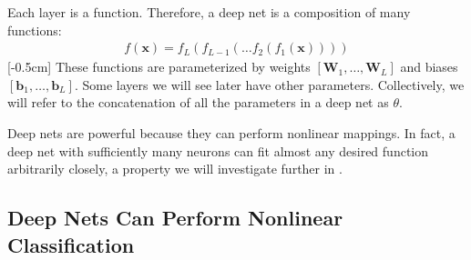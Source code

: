 Each layer is a function. Therefore, a deep net is a composition of many functions:
\begin{align}
    f(\mathbf{x}) = f_{L}(f_{L-1}(\ldots f_2(f_1(\mathbf{x}))))
\end{align}[-0.5cm]
These functions are parameterized by weights $[\mathbf{W}_1, \ldots, \mathbf{W}_L]$ and biases $[\mathbf{b}_1, \ldots, \mathbf{b}_L]$. Some layers we will see later have other parameters. Collectively, we will refer to the concatenation of all the parameters in a deep net as $\theta$. %

Deep nets are powerful because they can perform nonlinear mappings. In fact, a deep net with sufficiently many neurons can fit almost any desired function arbitrarily closely, a property we will investigate further in \sect{\ref{sec:neural_nets:universal_approximation}}. %


\subsection{Deep Nets Can Perform Nonlinear Classification}

